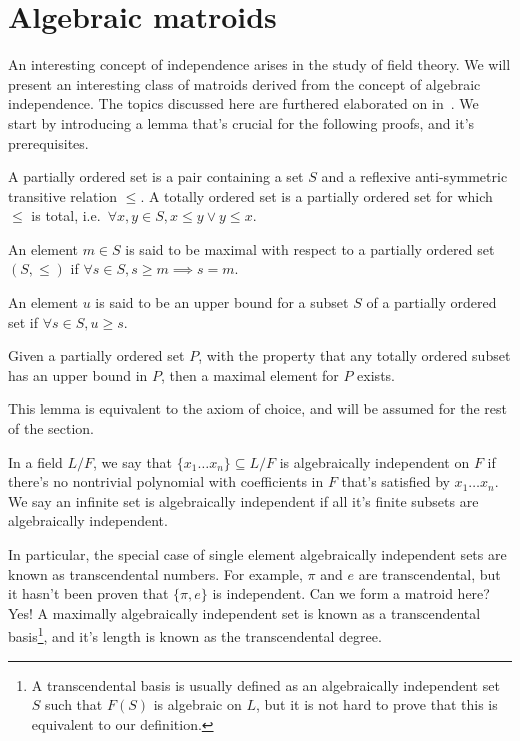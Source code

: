 \section{Algebraic matroids}

An interesting concept of independence arises in the study of field theory. We will present an interesting class of matroids derived from the concept of algebraic independence. The topics discussed here are furthered elaborated on in~\cite{milne2022}. We start by introducing a lemma that's crucial for the following proofs, and it's prerequisites.

\begin{defn}
    A partially ordered set is a pair containing a set $S$ and a reflexive anti-symmetric transitive relation $\leq$. A totally ordered set is a partially ordered set for which $\leq$ is total, i.e.\ $\forall x, y \in S, x \leq y \lor y \leq x$.
\end{defn}

\begin{defn}
    An element $m \in S$ is said to be maximal with respect to a partially ordered set $(S, \leq)$ if $\forall s \in S, s \geq m \implies s = m$.
\end{defn}

\begin{defn}
    An element $u$ is said to be an upper bound for a subset $S$ of a partially ordered set if $\forall s \in S, u \geq s$.
\end{defn}

\begin{lemma}[Zorn]\label{lem:Zorn}
   Given a partially ordered set $P$, with the property that any totally ordered subset has an upper bound in $P$, then a maximal element for $P$ exists.
\end{lemma}

This lemma is equivalent to the axiom of choice, and will be assumed for the rest of the section.

\begin{defn}
    In a field $L / F$, we say that $\{ x _1 \ldots x _n \} \subseteq L / F$ is algebraically independent on $F$ if there's no nontrivial polynomial with coefficients in $F$ that's satisfied by $x _1 \ldots x _n$. We say an infinite set is algebraically independent if all it's finite subsets are algebraically independent.
\end{defn}

   In particular, the special case of single element algebraically independent sets are known as transcendental numbers. For example, $\pi$  and $e$ are transcendental, but it hasn't been proven that $\{ \pi , e\}$ is independent. Can we form a matroid here? Yes! A maximally algebraically independent set is known as a transcendental basis\footnote{
A transcendental basis is usually defined as an algebraically independent set $S$ such that $F(S)$ is algebraic on $L$, but it is not hard to prove that this is equivalent to our definition.
   }, and it's length is known as the transcendental degree.

